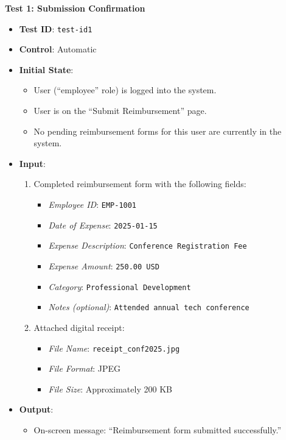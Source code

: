 \documentclass[12pt, titlepage]{article}
\begin{document}
\textbf{Test 1: Submission Confirmation}
\begin{itemize}
    \item \textbf{Test ID}: \texttt{test-id1}
    \item \textbf{Control}: Automatic
    \item \textbf{Initial State}:
    \begin{itemize}
        \item User (``employee'' role) is logged into the system.
        \item User is on the ``Submit Reimbursement'' page. 
        \item No pending reimbursement forms for this user are currently in the system.
    \end{itemize}
    \item \textbf{Input}:
    \begin{enumerate}
        \item Completed reimbursement form with the following fields:
        \begin{itemize}
            \item \textit{Employee ID}: \texttt{EMP-1001}
            \item \textit{Date of Expense}: \texttt{2025-01-15}
            \item \textit{Expense Description}: \texttt{Conference Registration Fee}
            \item \textit{Expense Amount}: \texttt{250.00 USD}
            \item \textit{Category}: \texttt{Professional Development}
            \item \textit{Notes (optional)}: \texttt{Attended annual tech conference}
        \end{itemize}
        \item Attached digital receipt: 
        \begin{itemize}
            \item \textit{File Name}: \texttt{receipt\_conf2025.jpg}
            \item \textit{File Format}: JPEG
            \item \textit{File Size}: Approximately 200 KB
        \end{itemize}
    \end{enumerate}
    \item \textbf{Output}:
    \begin{itemize}
        \item On-screen message: ``Reimbursement form submitted successfully.''

\end{itemize}
\end{itemize}
\end{document}
